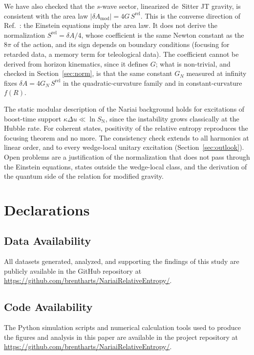 \documentclass[11pt]{article}
\newcommand{\Srel}{S^{\mathrm{rel}}}
\begin{document}
We have also checked that the $s$-wave sector, linearized de~Sitter JT gravity, is consistent with the area law $|\delta A_{\mathrm{mod}}|=4G\,\Srel$. This is the converse direction of Ref.~\cite{DorauMuch}: the Einstein equations imply the area law. It does not derive the normalization $\Srel=\delta A/4$, whose coefficient is the same Newton constant as the $8\pi$ of the action, and its sign depends on boundary conditions (focusing for retarded data, a memory term for teleological data). The coefficient cannot be derived from horizon kinematics, since it defines $G$; what is non-trivial, and checked in Section~\ref{sec:norm}, is that the same constant $G_N$ measured at infinity fixes $\delta A=4G_N\,\Srel$ in the quadratic-curvature family and in constant-curvature $f(R)$.

The static modular description of the Nariai background holds for excitations of boost-time support $\kappa\Delta u\ll\ln S_{\mathrm N}$, since the instability grows classically at the Hubble rate. For coherent states, positivity of the relative entropy reproduces the focusing theorem and no more. The consistency check extends to all harmonics at linear order, and to every wedge-local unitary excitation (Section~\ref{sec:outlook}). Open problems are a justification of the normalization that does not pass through the Einstein equations, states outside the wedge-local class, and the derivation of the quantum side of the relation for modified gravity.

\section*{Declarations}

\subsection*{Data Availability}
All datasets generated, analyzed, and supporting the findings of this study are publicly available in the GitHub repository at \url{https://github.com/brentharts/NariaiRelativeEntropy/}.

\subsection*{Code Availability}
The Python simulation scripts and numerical calculation tools used to produce the figures and analysis in this paper are available in the project repository at \url{https://github.com/brentharts/NariaiRelativeEntropy/}.
\end{document}
